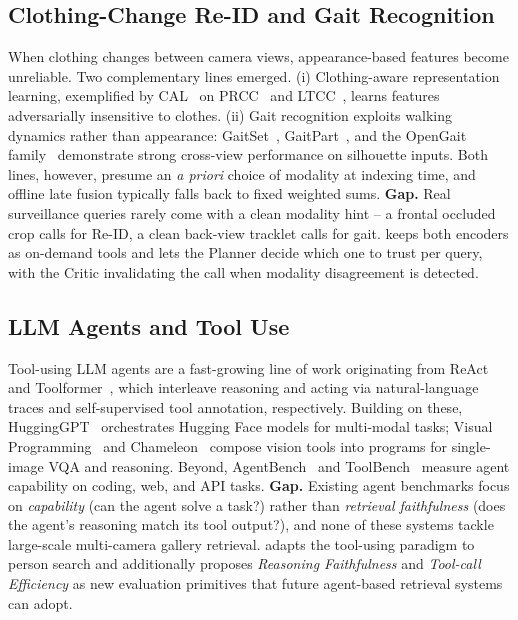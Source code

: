\subsection{Clothing-Change Re-ID and Gait Recognition}
\label{ssec:rel_cc_gait}
When clothing changes between camera views, appearance-based features
become unreliable. Two complementary lines emerged. (i) Clothing-aware
representation learning, exemplified by CAL~\cite{gu2022cal} on
PRCC~\cite{yang2019prcc} and LTCC~\cite{qian2020ltcc}, learns features
adversarially insensitive to clothes. (ii) Gait recognition exploits
walking dynamics rather than appearance: GaitSet~\cite{chao2019gaitset},
GaitPart~\cite{fan2020gaitpart}, and the OpenGait
family~\cite{fan2023opengait} demonstrate strong cross-view performance
on silhouette inputs. Both lines, however, presume an \emph{a priori}
choice of modality at indexing time, and offline late fusion
typically falls back to fixed weighted sums.
\textbf{Gap.} Real surveillance queries rarely come with a clean modality
hint -- a frontal occluded crop calls for Re-ID, a clean back-view
tracklet calls for gait. \method{} keeps both encoders as on-demand
tools and lets the Planner decide which one to trust per query, with the
Critic invalidating the call when modality disagreement is detected.

\subsection{LLM Agents and Tool Use}
\label{ssec:rel_agents}
Tool-using LLM agents are a fast-growing line of work originating from
ReAct~\cite{yao2023react} and Toolformer~\cite{schick2023toolformer},
which interleave reasoning and acting via natural-language traces and
self-supervised tool annotation, respectively. Building on these,
HuggingGPT~\cite{shen2023hugginggpt} orchestrates Hugging Face models for
multi-modal tasks; Visual Programming~\cite{gupta2023visprog} and
Chameleon~\cite{lu2023chameleon} compose vision tools into programs for
single-image VQA and reasoning. Beyond, AgentBench~\cite{liu2024agentbench}
and ToolBench~\cite{qin2024toolbench} measure agent capability on coding,
web, and API tasks. \textbf{Gap.} Existing agent benchmarks focus on
\emph{capability} (can the agent solve a task?) rather than
\emph{retrieval faithfulness} (does the agent's reasoning match its tool
output?), and none of these systems tackle large-scale multi-camera
gallery retrieval. \method{} adapts the tool-using paradigm to person
search and additionally proposes \emph{Reasoning Faithfulness} and
\emph{Tool-call Efficiency} as new evaluation primitives that future
agent-based retrieval systems can adopt.

